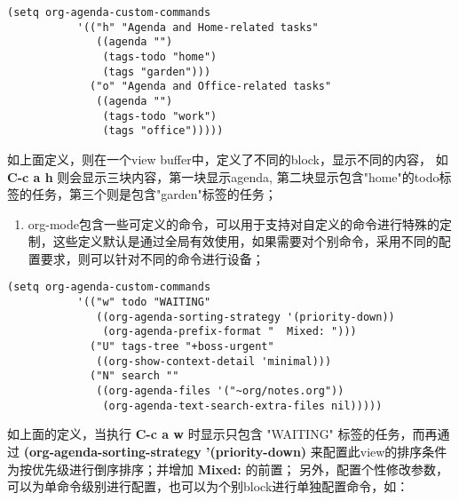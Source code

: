 \documentclass[10pt,a4paper]{article}
\begin{document}
\begin{enumerate}
\begin{lstlisting}
(setq org-agenda-custom-commands
           '(("h" "Agenda and Home-related tasks"
              ((agenda "")
               (tags-todo "home")
               (tags "garden")))
             ("o" "Agenda and Office-related tasks"
              ((agenda "")
               (tags-todo "work")
               (tags "office")))))
\end{lstlisting}
如上面定义，则在一个view buffer中，定义了不同的block，显示不同的内容， 如 \textbf{C-c a h} 则会显示三块内容，第一块显示agenda, 第二块显示包含"home"的todo标签的任务，第三个则是包含"garden"标签的任务；
\begin{enumerate}
\item org-mode包含一些可定义的命令，可以用于支持对自定义的命令进行特殊的定制，这些定义默认是通过全局有效使用，如果需要对个别命令，采用不同的配置要求，则可以针对不同的命令进行设备；
\end{enumerate}
\begin{lstlisting}
(setq org-agenda-custom-commands
           '(("w" todo "WAITING"
              ((org-agenda-sorting-strategy '(priority-down))
               (org-agenda-prefix-format "  Mixed: ")))
             ("U" tags-tree "+boss-urgent"
              ((org-show-context-detail 'minimal)))
             ("N" search ""
              ((org-agenda-files '("~org/notes.org"))
               (org-agenda-text-search-extra-files nil)))))
\end{lstlisting}
如上面的定义，当执行 \textbf{C-c a w} 时显示只包含 "WAITING" 标签的任务，而再通过 \textbf{(org-agenda-sorting-strategy '(priority-down)} 来配置此view的排序条件为按优先级进行倒序排序；并增加 \textbf{Mixed:} 的前置；
另外，配置个性修改参数，可以为单命令级别进行配置，也可以为个别block进行单独配置命令，如：

\end{enumerate}
\end{document}
